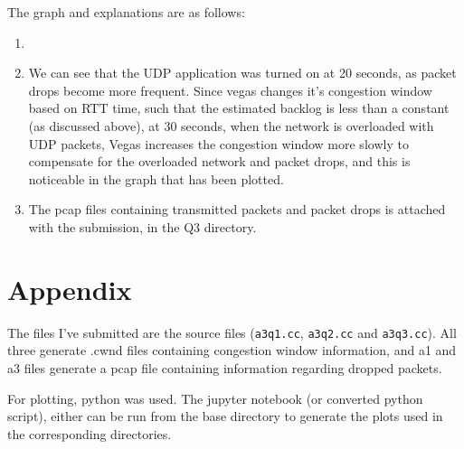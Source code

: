 \documentclass[12pt]{article}
\begin{document}
The graph and explanations are as follows:

\begin{enumerate}
    \item \begin{center}
    \end{center}

    \item We can see that the UDP application was turned on at 20 seconds, as 
    packet drops become more frequent. Since vegas changes it's congestion window 
    based on RTT time, such that the estimated backlog is less than a constant 
    (as discussed above), 
    at 30 seconds, when the network is overloaded with UDP 
    packets, Vegas increases the congestion window more slowly to compensate
    for the overloaded network and packet drops, and this is noticeable in the 
    graph that has been plotted.
    
    \item The pcap files containing transmitted packets and packet drops is 
        attached with the 
        submission, in the Q3 directory.

\end{enumerate}

\clearpage

\section*{Appendix}

The files I've submitted are the source files (\texttt{a3q1.cc}, \texttt{a3q2.cc}
and \texttt{a3q3.cc}). All three generate .cwnd files containing congestion 
window information, and a1 and a3 files generate a pcap file containing information
regarding dropped packets. 

For plotting, python was used. The jupyter notebook (or converted python script), 
either can be run from the base directory to generate the plots used in the 
corresponding directories.
\end{document}
